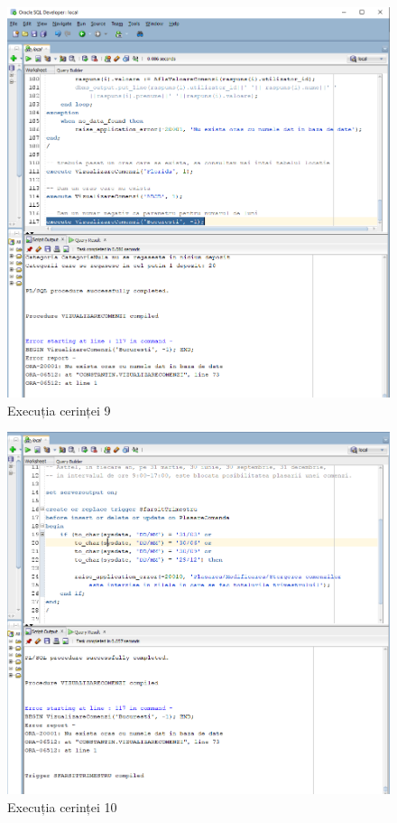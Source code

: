 \documentclass[12pt]{article}
\begin{document}
\begin{figure}[htp]
\centering
\includegraphics[width=1\linewidth]{Cerinta9.png}
\caption{Execuția cerinței 9}
\end{figure}

\begin{figure}[htp]
\centering
\includegraphics[width=1\linewidth]{Cerinta10.png}
\caption{Execuția cerinței 10}
\end{figure}
\end{document}
